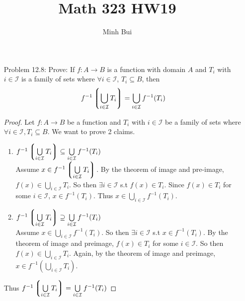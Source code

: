 \documentclass{article}
\author{Minh Bui}
\title{Math 323 HW19}
\theoremstyle{claim}
\theoremstyle{definition}
\begin{document}
\maketitle
\begin{enumerate}
    \item[Problem 12.8:] Prove: If $f : A \rightarrow B$ is a function with domain $A$ and $T_i$ with $i \in \mathcal{I}$ is a family of sets where $\forall i \in \mathcal{I}$, $T_i \subseteq B$, then
        \begin{equation*}
            f^{-1} \left \lgroup \bigcup\limits_{i \in \mathcal{I}} T_i \right \rgroup = \bigcup\limits_{i \in \mathcal{I}} f^{-1}(T_i)
        \end{equation*}
        \begin{proof}
            Let $f : A \rightarrow B$ be a function and $T_i$ with $i \in \mathcal{I}$ be a family of sets where $\forall i \in \mathcal{I}, T_i \subseteq B$. We want to prove 2 claims.
            \begin{enumerate}
                \item $f^{-1} \left \lgroup \bigcup\limits_{i \in \mathcal{I}} T_i \right \rgroup \subseteq \bigcup\limits_{i \in \mathcal{I}} f^{-1}(T_i)$\\
                    Assume $x \in f^{-1} \left \lgroup \bigcup\limits_{i \in \mathcal{I}} T_i \right \rgroup$. By the theorem of image and pre-image, $f(x) \in \bigcup\limits_{i \in \mathcal{I}} T_i$. So then $\exists i \in \mathcal{I}$ s.t $f(x) \in T_i$. Since $f(x) \in T_i$ for some $i \in \mathcal{I}$, $x \in f^{-1}(T_i)$. Thus $x \in \bigcup\limits_{i \in \mathcal{I}} f^{-1}(T_i)$.
                \item $f^{-1} \left \lgroup \bigcup\limits_{i \in \mathcal{I}} T_i \right \rgroup \supseteq \bigcup\limits_{i \in \mathcal{I}} f^{-1}(T_i)$\\
                    Assume $x \in \bigcup\limits_{i \in \mathcal{I}} f^{-1}(T_i)$. So then $\exists i \in \mathcal{I}$ s.t $x \in f^{-1}(T_i)$. By the theorem of image and preimage, $f(x) \in T_i$ for some $i \in \mathcal{I}$. So then $f(x) \in \bigcup\limits_{i \in \mathcal{I}} T_i$. Again, by the theorem of image and preimage, $x \in f^{-1}(\bigcup\limits_{i \in \mathcal{I}} T_i)$.
            \end{enumerate}
            Thus $f^{-1} \left \lgroup \bigcup\limits_{i \in \mathcal{I}} T_i \right \rgroup = \bigcup\limits_{i \in \mathcal{I}} f^{-1}(T_i)$
        \end{proof}

\end{enumerate}
\end{document}
